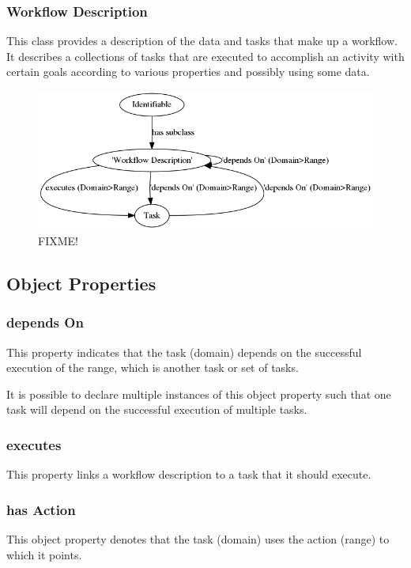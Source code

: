 \subsubsection{Workflow Description}

This class provides a description of the data and tasks that make up a
workflow. It describes a collections of tasks that are executed to accomplish
an activity with certain goals according to various properties and possibly
using some data.

\begin{figure}[htbp]
\centering
\includegraphics[width=\textwidth]{figures/workflowDescription.png}
\caption{FIXME!}
\label{workflow-description}
\end{figure}


\subsection{Object Properties}
			\subsubsection{
			depends On
			}
			This property indicates that the task (domain) depends on the successful execution of the range, which is another task or set of tasks.

It is possible to declare multiple instances of this object property such that one task will depend on the successful execution of multiple tasks.
			\subsubsection{
			executes
			}
			This property links a workflow description to a task that it should execute.
			\subsubsection{
			has Action
			}
			This object property denotes that the task (domain) uses the action (range) to which it points.
